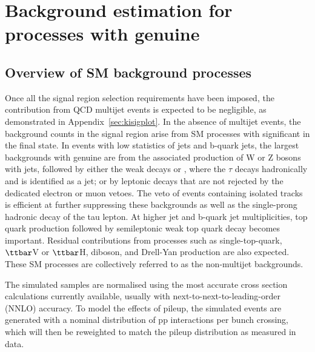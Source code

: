 
\section{Background estimation for processes with genuine \met}
\label{sec:backgroundmet}
\subsection{Overview of SM background processes}

Once all the signal region selection requirements have been imposed,
the contribution from QCD multijet events is expected to be
negligible, as demonstrated in Appendix~\ref{sec:kisigplot}. In the absence of
multijet events, the background counts in the signal region arise from
SM processes with significant \met in the final state. In events with
low statistics of jets and b-quark jets, the largest backgrounds with
genuine \met are from the associated production of W or Z bosons with
jets, followed by either the weak decays \znunu or \wtaunu, where the
$\tau$ decays hadronically and is identified as a jet; or by leptonic
decays that are not rejected by the dedicated electron or muon
vetoes. The veto of events containing isolated tracks is efficient at
further suppressing these backgrounds as well as the single-prong
hadronic decay of the tau lepton. At higher jet and b-quark jet
multiplicities, top quark production followed by semileptonic weak top
quark decay becomes important.  Residual contributions from processes
such as single-top-quark, $\ttbar$V or $\ttbar$H, diboson, and
Drell-Yan production are also expected. These SM processes are
collectively referred to as the non-multijet backgrounds.

The simulated samples are normalised using the most accurate cross
section calculations currently available, usually with
next-to-next-to-leading-order (NNLO) accuracy. To model the effects of
pileup, the simulated events are generated with a nominal distribution
of pp interactions per bunch crossing, which will then be reweighted
to match the pileup distribution as measured in data. 


